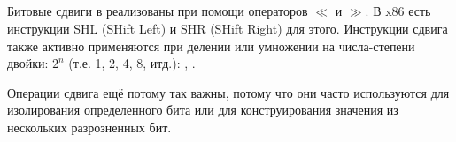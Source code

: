 \subsection{\ShiftsSectionName}

Битовые сдвиги в \CCpp реализованы при помощи операторов $\ll$ и $\gg$.
В x86 есть инструкции SHL (SHift Left) и SHR (SHift Right) для этого.
Инструкции сдвига также активно применяются при делении или умножении на числа-степени двойки: $2^{n}$ (т.е. 1, 2, 4, 8, итд.):
,
.


Операции сдвига ещё потому так важны, потому что они часто используются для изолирования
определенного бита или для конструирования значения из нескольких разрозненных бит.

